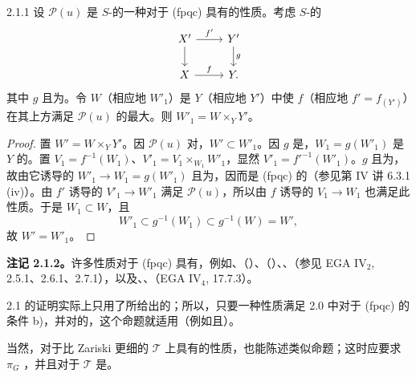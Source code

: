 \begin{SGAresult}{}{2.1.1}
设 $\mathscr P(u)$ 是 $S$-的一种对于 (fpqc) 具有的性质。考虑 $S$-的
\[
\begin{tikzcd}
X'\arrow[r,"f'"]\arrow[d]&Y'\arrow[d,"g"]\\
X\arrow[r,"f"]&Y.
\end{tikzcd}
\]
其中 $g$ 且为。令 $W$（相应地 $W'_1$）是 $Y$（相应地 $Y'$）中使 $f$（相应地 $f'=f_{(Y')}$）在其上方满足 $\mathscr P(u)$ 的最大。则 $W'_1=W\times_YY'$。
\end{SGAresult}
\begin{proof}
置 $W'=W\times_YY'$。因 $\mathscr P(u)$ 对，$W'\subset W'_1$。因 $g$ 是，$W_1=g(W'_1)$ 是 $Y$ 的。置 $V_1=f^{-1}(W_1)$、$V'_1=V_1\times_{W_1}W'_1$，显然 $V'_1=f'^{-1}(W'_1)$。$g$ 且为，故由它诱导的 $W'_1\to W_1=g(W'_1)$ 且为，因而是 (fpqc) 的（参见第 IV 讲 6.3.1 (iv)）。由 $f'$ 诱导的 $V'_1\to W'_1$ 满足 $\mathscr P(u)$，所以由 $f$ 诱导的 $V_1\to W_1$ 也满足此性质。于是 $W_1\subset W$，且
\[
W'_1\subset g^{-1}(W_1)\subset g^{-1}(W)=W',
\]
故 $W'=W'_1$。
\end{proof}
\textbf{注记 2.1.2。}许多性质对于 (fpqc) 具有，例如、（）、（）、、（参见 EGA IV$_2$, 2.5.1、2.6.1、2.7.1），以及、、（EGA IV$_4$, 17.7.3）。

2.1 的证明实际上只用了所给出的；所以，只要一种性质满足 2.0 中对于 (fpqc) 的条件 b)，并对的，这个命题就适用（例如且）。

当然，对于比 Zariski 更细的 $\mathcal T$ 上具有的性质，也能陈述类似命题；这时应要求 $\pi_G$ ，并且对于 $\mathcal T$ 是。

